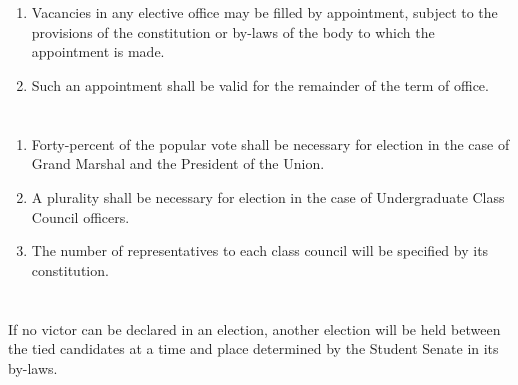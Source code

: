 \section{}
\begin{enumerate}
\item Vacancies in any elective office may be filled by appointment, subject to the provisions of the
constitution or by-laws of the body to which the appointment is made.
\item Such an appointment shall be valid for the remainder of the term of office.
\end{enumerate}

\section{}
\begin{enumerate}
\item Forty-percent of the popular vote shall be necessary for election in the case of Grand Marshal
and the President of the Union.
\item A plurality shall be necessary for election in the case of Undergraduate Class Council officers.
\item The number of representatives to each class council will be specified by its constitution.
\end{enumerate}

\section{}
If no victor can be declared in an election, another election will be held between the tied candidates at a
time and place determined by the Student Senate in its by-laws.

